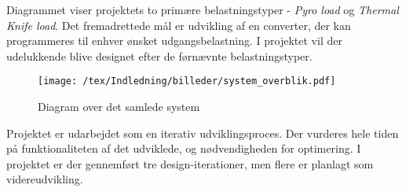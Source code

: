Diagrammet viser projektets to primære belastningstyper - \textit{Pyro load} og \textit{Thermal Knife load}. Det fremadrettede mål er udvikling af en converter, der kan programmeres til enhver ønsket udgangsbelastning. I projektet vil der udelukkende blive designet efter de førnævnte belastningstyper.

\begin{figure}[H]
	\center
	\texttt{[image: /tex/Indledning/billeder/system\_overblik.pdf]}
	\caption{Diagram over det samlede system}
	\label{fig:system_overblik}
\end{figure}

\noindent Projektet er udarbejdet som en iterativ udviklingsproces. Der vurderes hele tiden på funktionaliteten af det udviklede, og nødvendigheden for optimering. I projektet er der gennemført tre design-iterationer, men flere er planlagt som videreudvikling. 




\clearpage

